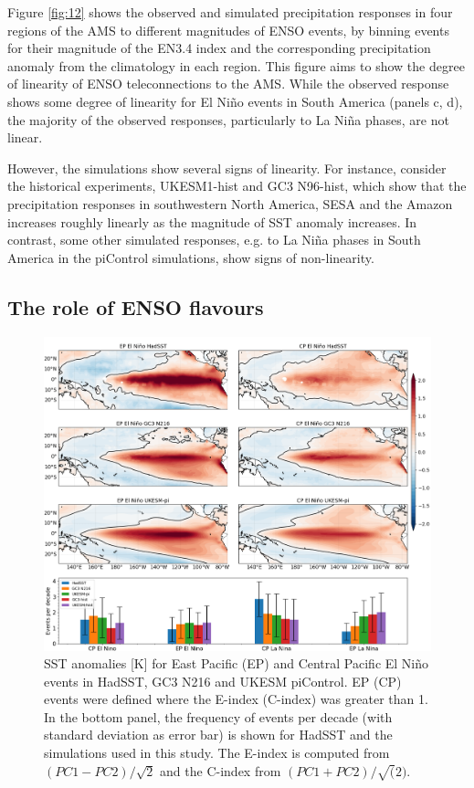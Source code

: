 




 Figure \ref{fig:12} shows the observed and simulated precipitation responses in four regions of the AMS to different magnitudes of ENSO events, by binning events for their magnitude of the EN3.4 index and the corresponding precipitation anomaly from the climatology in each region. This figure aims to show  the degree of linearity of ENSO teleconnections to the AMS.
While the observed response shows some degree of linearity for El Ni\~no events in South America (panels c, d), the majority of the observed responses, particularly to La Ni\~na phases, are not linear.

 However, the simulations show several signs of linearity. For instance, consider the historical experiments, UKESM1-hist and GC3 N96-hist, which show that the precipitation responses in southwestern North America, SESA and the Amazon increases roughly linearly as the magnitude of SST anomaly increases. In contrast, some other simulated responses, e.g. to La Ni\~na phases in South America in the piControl simulations, show signs of non-linearity.



\subsection{The role of ENSO flavours}
  
\begin{figure}[b!]
\includegraphics[width=\linewidth]{figures/epcpmap}
\caption[Diversity of ENSO SST patterns]{SST anomalies [K] for East Pacific (EP) and Central Pacific El Niño events in HadSST, GC3 N216 and UKESM piControl. EP (CP) events were defined where the E-index (C-index) was greater than 1. In the bottom panel, the frequency of events per decade (with standard deviation as error bar) is shown for HadSST and the simulations used in this study.
The E-index is computed from $(PC1-PC2)/\sqrt{2}$ and the C-index from $(PC1+PC2)/\sqrt(2)$.
}
\label{fig:s1}
\end{figure}


